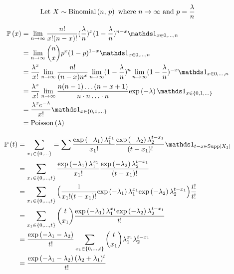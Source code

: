 \documentclass[12pt]{article}
\begin{document}
\begin{enumerate}

\begin{align*}
    \text{Let } X \sim \mathrm{Binomial}\left(n,\,p\right) \text{ where } n \to\infty \text{ and } p = \frac{\lambda}{n}
\end{align*}

\begin{align*}
    \prob{x} &=  \lim_{n \to \infty} \frac{n!}{x!(n-x)!} (\frac{\lambda}{n})^x(1 - \frac{\lambda}{n})^{n-x} \indic{x \in {0, \ldots, n}} \\
    &= \lim_{n \to \infty} {n \choose x} p^x(1-p)^{1-x}\indic{x \in {0, \ldots, n}} \\
    &= \frac{\lambda^x}{x!} \lim_{n \to \infty} \frac{n!}{(n-x)n^x} \lim_{n \to \infty} (1 - \frac{\lambda}{n})^n \lim_{n \to \infty} (1-\frac{\lambda}{n})^{-x} \indic{x \in {0, \ldots, n}} \\ 
    &= \frac{\lambda^x}{x!} \lim_{n \to \infty} \frac{n(n-1)\ldots(n-x+1)}{n \cdot n \ldots \cdot n} \exp{- \lambda} \indic{x \in \braces{0, 1, \ldots}} \\ 
    &= \frac{\lambda^x e^{-\lambda}}{x!} \indic{x \in \braces{0, 1, \ldots}} \\ 
    &= \poisson{\lambda} 
\end{align*}



\begin{align*}
    \prob{t} &= \sum_{x_1 \in \braces{0, \ldots}} = \sum \frac{\exp{-\lambda_1}\lambda_{1}^{x_{1}}}{x_{1}!} \frac{\exp{-\lambda_2}\lambda_{2}^{t-x_1}}{(t-x_1)!}\indic{t-x \in \support{X_1}} \\
    &= \sum_{x_1 \in \braces{0,\ldots,t}} \frac{\exp{-\lambda_1}\lambda_{1}^{x_{1}}}{x_{1}!} \frac{\exp{-\lambda_2}\lambda_{2}^{t-x_1}}{(t-x_1)!} \\
    &= \sum_{x_1 \in \braces{0,\ldots,t}} \Big(\frac{1}{x_1!(t-x_1)!} \exp{-\lambda_1}\lambda_{1}^{x_{1}} \exp{-\lambda_2}\lambda_{2}^{t-x_1}\Big)\frac{t!}{t!} \\
    &= \sum_{x_1 \in \braces{0,\ldots,t}} {t \choose x_1} \frac{\exp{-\lambda_1}\lambda_{1}^{x_{1}}\exp{-\lambda_2}\lambda_{2}^{t-x_1}}{t!} \\
    &= \frac{\exp{-\lambda_{1} - \lambda_{2}}}{t!} \sum_{x_1 \in \braces{0,\ldots,t}} {t \choose x_1} \lambda_{1}^{x_1}\lambda_{2}^{t-x_1} \\
    &= \frac{\exp{-\lambda_{1} - \lambda_{2}} (\lambda_2 + \lambda_1)^t}{t!}
\end{align*}


\end{enumerate}
\end{document}
